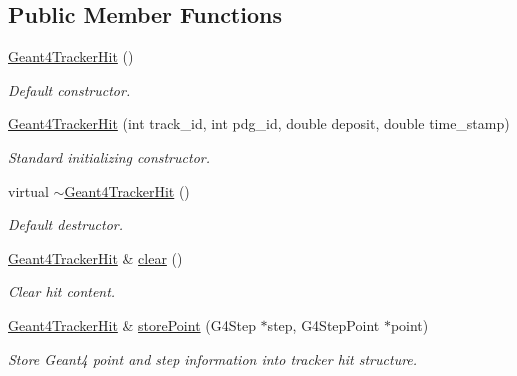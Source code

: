 \subsection*{Public Member Functions}
\begin{DoxyCompactItemize}
\item 
\hyperlink{class_d_d4hep_1_1_simulation_1_1_geant4_tracker_hit_a7642c87408d8d1fc386b297c351747ad}{Geant4TrackerHit} ()
\begin{DoxyCompactList}\small\item\em Default constructor. \item\end{DoxyCompactList}\item 
\hyperlink{class_d_d4hep_1_1_simulation_1_1_geant4_tracker_hit_a0c4153d51119c6b58e6318ff7d9a9a1b}{Geant4TrackerHit} (int track\_\-id, int pdg\_\-id, double deposit, double time\_\-stamp)
\begin{DoxyCompactList}\small\item\em Standard initializing constructor. \item\end{DoxyCompactList}\item 
virtual \hyperlink{class_d_d4hep_1_1_simulation_1_1_geant4_tracker_hit_a4f4febb374cab1cb2e8a0463b84c165e}{$\sim$Geant4TrackerHit} ()
\begin{DoxyCompactList}\small\item\em Default destructor. \item\end{DoxyCompactList}\item 
\hyperlink{class_d_d4hep_1_1_simulation_1_1_geant4_tracker_hit}{Geant4TrackerHit} \& \hyperlink{class_d_d4hep_1_1_simulation_1_1_geant4_tracker_hit_ae4ad76e698755a72feaf4c7f38d5281f}{clear} ()
\begin{DoxyCompactList}\small\item\em Clear hit content. \item\end{DoxyCompactList}\item 
\hyperlink{class_d_d4hep_1_1_simulation_1_1_geant4_tracker_hit}{Geant4TrackerHit} \& \hyperlink{class_d_d4hep_1_1_simulation_1_1_geant4_tracker_hit_a1c59f0271ec61e504bf572ed4e9b2bb0}{storePoint} (G4Step $\ast$step, G4StepPoint $\ast$point)
\begin{DoxyCompactList}\small\item\em Store Geant4 point and step information into tracker hit structure. \item\end{DoxyCompactList}\item 

\end{DoxyCompactItemize}
